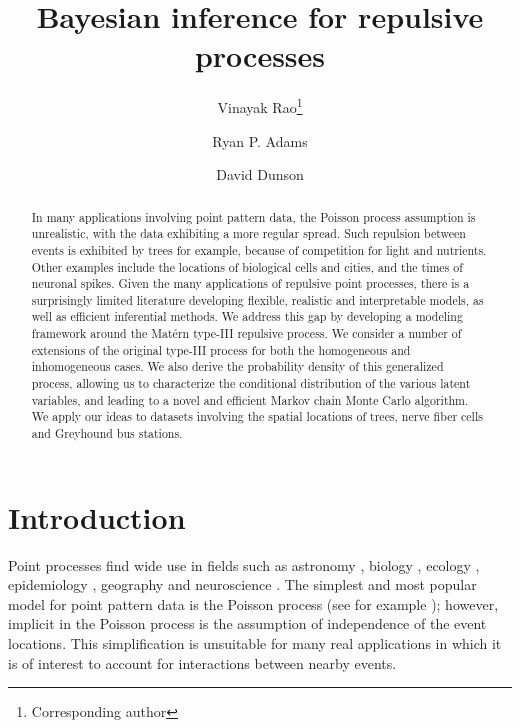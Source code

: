 \documentclass{statsoc}
\title{Bayesian inference for \matern repulsive processes}
\author{Vinayak Rao\thanks{Corresponding author}}
\author{Ryan P. Adams}
\author{David Dunson}
\date{}
\begin{document}
\maketitle
\begin{abstract}
In many applications involving point pattern data, the Poisson process assumption is unrealistic, with the data exhibiting a
more regular spread.
Such repulsion between events is exhibited by trees for example, because of competition for light and nutrients. Other examples include the locations of 
biological cells and cities, and the times of neuronal spikes. Given the many 
applications of repulsive point processes, there is a surprisingly limited literature developing flexible, realistic and interpretable models, as well as 
efficient inferential 
methods.  We address this gap by developing a modeling framework around the Mat\'ern type-III repulsive process. 
We consider a number of extensions of the original \matern type-III process for both the homogeneous and inhomogeneous cases.
We also derive the probability density of this generalized \matern process, allowing us to characterize the conditional distribution of the various 
latent variables, and leading to a novel and efficient Markov chain Monte Carlo algorithm.
We apply our ideas to datasets involving the spatial locations of trees, nerve
fiber cells and Greyhound bus stations.
\end{abstract}



\section{Introduction}

Point processes find wide use in fields such as 
astronomy \citep{Peebles74}, biology \citep{WallSar11}, ecology \citep{Hill1973}, epidemiology \citep{Knox04}, geography \citep{kendall39} and 
neuroscience \citep{Brown2004a}. The simplest and most popular model for point pattern data is the Poisson process (see for example \citet{DalVer2008a}); however, implicit in the 
Poisson process is the assumption of independence of the event locations. This simplification is unsuitable for many
real applications in which it is of interest to account for interactions between nearby events. 
\end{document}
